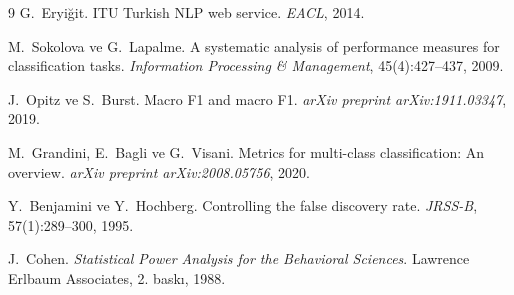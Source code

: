 \documentclass[11pt,a4paper]{article}
\begin{document}
\begin{thebibliography}{9}
G.~Eryi\u{g}it. ITU Turkish NLP web service. \emph{EACL}, 2014.

M.~Sokolova ve G.~Lapalme. A systematic analysis of performance
measures for classification tasks. \emph{Information Processing
\& Management}, 45(4):427--437, 2009.

J.~Opitz ve S.~Burst. Macro F1 and macro F1. \emph{arXiv preprint
arXiv:1911.03347}, 2019.

M.~Grandini, E.~Bagli ve G.~Visani. Metrics for multi-class
classification: An overview. \emph{arXiv preprint arXiv:2008.05756}, 2020.

Y.~Benjamini ve Y.~Hochberg. Controlling the false discovery rate.
\emph{JRSS-B}, 57(1):289--300, 1995.

J.~Cohen. \emph{Statistical Power Analysis for the Behavioral Sciences}.
Lawrence Erlbaum Associates, 2. baskı, 1988.

\end{thebibliography}
\end{document}

